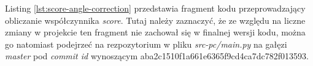 
Listing \ref{lst:score-angle-correction} przedstawia fragment kodu przeprowadzający obliczanie współczynnika \emph{score}. Tutaj należy zaznaczyć, że ze względu na liczne zmiany w projekcie ten fragment nie zachował się w finalnej wersji kodu, można go natomiast podejrzeć na rezpozytorium w pliku \emph{src-pc/main.py} na gałęzi \emph{master} pod \emph{commit id} wynoszącym aba2c1510f1a661e6365f9cd4ca7dc782f013593.

